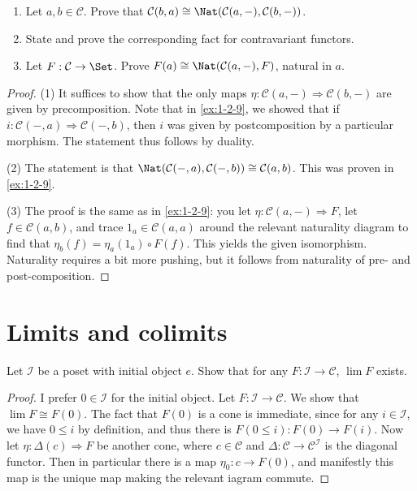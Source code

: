 \begin{exercise}
	\begin{enumerate}
		\item Let $a,b\in \mathcal{C} $. Prove that $\mathcal{C} (b,a) \cong \Nat(\mathcal{C} (a,-), \mathcal{C} (b,-)) $.
		\item State and prove the corresponding fact for contravariant functors.
		\item Let $F : \mathcal{C}  \to \Set $. Prove $F(a) \cong \Nat(\mathcal{C} (a,-),F)$, natural in $a$.
	\end{enumerate}
\end{exercise}
\begin{proof}
	(1) It suffices to show that the only maps $\eta : \mathcal{C} (a,-) \Rightarrow \mathcal{C} (b,-)$ are given by precomposition. Note that in \cref{ex:1-2-9}, we showed that if $i : \mathcal{C} (-,a) \Rightarrow \mathcal{C} (-,b)$, then $i$ was given by postcomposition by a particular morphism. The statement thus follows by duality.

	(2) The statement is that $\Nat(\mathcal{C} (-,a),\mathcal{C} (-,b))\cong \mathcal{C} (a,b)$. This was proven in \cref{ex:1-2-9}.

	(3) The proof is the same as in \cref{ex:1-2-9}: you let $\eta : \mathcal{C} (a,-) \Rightarrow F$, let $f\in \mathcal{C} (a,b)$, and trace $1_a\in \mathcal{C} (a,a)$ around the relevant naturality diagram to find that $\eta_b(f) = \eta _a(1_a)\circ F(f)$. This yields the given isomorphism. Naturality requires a bit more pushing, but it follows from naturality of pre- and post-composition.
\end{proof}

\section{Limits and colimits}

\begin{exercise}
	Let $\mathcal{I} $ be a poset with initial object $e$. Show that for any $F : \mathcal{I}  \to \mathcal{C} $, $\lim F$ exists.
\end{exercise}
\begin{proof}
	I prefer $0\in \mathcal{I} $ for the initial object. Let $F : \mathcal{I}  \to \mathcal{C} $. We show that $\lim F\cong F(0)$. The fact that $F(0)$ is a cone is immediate, since for any $i\in \mathcal{I} $, we have $0\leq i$ by definition, and thus there is $F(0\leq i): F(0) \to F(i)$. Now let $\eta : \Delta (c) \Rightarrow F$ be another cone, where $c\in \mathcal{C} $ and $\Delta : \mathcal{C}  \to \mathcal{C} ^{\mathcal{I} }$ is the diagonal functor. Then in particular there is a map $\eta _0: c \to F(0)$, and manifestly this map is the unique map making the relevant iagram commute.
\end{proof}

